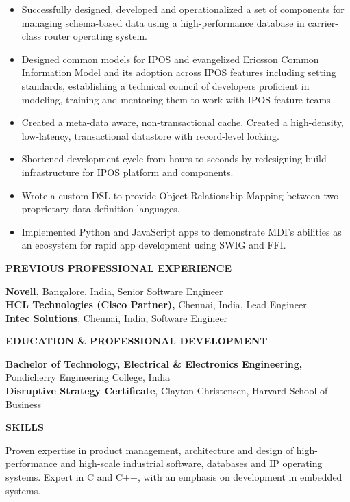 \documentclass[
]{article}
\newcommand{\LR}[1]{\beginL #1\endL}
\begin{document}
\begin{itemize}
\item
  \LR{Successfully designed, developed and operationalized a set of
  components for managing schema-based data using a high-performance
  database in carrier-class router operating system.}
\item
  \LR{Designed common models for IPOS and evangelized Ericsson Common
  Information Model and its adoption across IPOS features including
  setting standards, establishing a technical council of developers
  proficient in modeling, training and mentoring them to work with IPOS
  feature teams.}
\item
  \LR{Created a meta-data aware, non-transactional cache. Created a
  high-density, low-latency, transactional datastore with record-level
  locking.}
\item
  \LR{Shortened development cycle from hours to seconds by redesigning
  build infrastructure for IPOS platform and components.}
\item
  \LR{Wrote a custom DSL to provide Object Relationship Mapping between
  two proprietary data definition languages.}
\item
  \LR{Implemented Python and JavaScript apps to demonstrate MDI's
  abilities as an ecosystem for rapid app development using SWIG and
  FFI.}
\end{itemize}

\LR{\textbf{PREVIOUS PROFESSIONAL EXPERIENCE}}

\LR{
    \textbf{Novell,} Bangalore, India, Senior Software Engineer\\
    \textbf{HCL Technologies (Cisco Partner),} Chennai, India, Lead Engineer\\
    \textbf{Intec Solutions}, Chennai, India, Software Engineer
}

\LR{\textbf{EDUCATION \& PROFESSIONAL DEVELOPMENT}}

\LR{
    \textbf{Bachelor of Technology, Electrical \& Electronics Engineering,} Pondicherry Engineering College, India\\
    \textbf{Disruptive Strategy Certificate}, Clayton Christensen, Harvard School of Business
}

\LR{\textbf{SKILLS}}

\LR{Proven expertise in product management, architecture and design of
high-performance and high-scale industrial software, databases and IP
operating systems. Expert in C and C++, with an emphasis on development
in embedded systems.}
\end{document}
